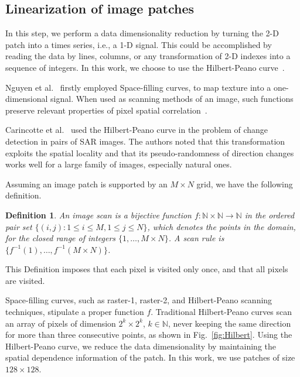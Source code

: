 \documentclass[journal]{IEEEtran}
\begin{document}
	\subsection{Linearization of image patches}\label{linearization}
	
	In this step, we perform a data dimensionality reduction by turning the 2-D patch into a times series, i.e., a 1-D signal.
	This could be accomplished by reading the data by lines, columns, or any transformation of 2-D indexes into a sequence of integers.
	In this work, we choose to use the Hilbert-Peano curve~\cite{Lee1994Texture}.
	
	Nguyen et al.~\cite{nguyen1982space} firstly employed Space-filling curves, to map texture into a one-dimensional signal.
	When used as scanning methods of an image, such functions preserve relevant properties of pixel spatial correlation~\cite{Lee1994Texture}.
	
	Carincotte et al.~\cite{Carincotte2006changeDetection} used the Hilbert-Peano curve in the problem of change detection in pairs of SAR images.
	The authors noted that this transformation exploits the spatial locality and that its pseudo-randomness
	of direction changes works well for a large family of images, especially
	natural ones.
	
	Assuming an image patch is supported by an $M \times N$ grid, we have the following definition.
	
	\newtheorem{mydef}{Definition}
	\begin{mydef}
		An image scan is a bijective function $f \colon \mathbb{N} \times \mathbb{N} \to \mathbb{N}$ in the ordered pair set $ \{(i, j): 1 \leq i \leq M , 1 \leq j \leq N\}$, which denotes the points in the domain, for the closed range of integers $\{1, \dots, M \times N\}$.
		A scan rule is $\{f^{-1}(1), \dots, f^{-1}(M \times N)\}$.
		\label{def:CurveFilling}
	\end{mydef}
	This Definition imposes that each pixel is visited only once, and that all pixels are visited.
	
	Space-filling curves, such as raster-1, raster-2, and Hilbert-Peano scanning techniques, stipulate a proper function $f$.
	Traditional Hilbert-Peano curves scan an array of pixels of dimension $2^k \times 2^k$, $k \in \mathbb{N}$, never keeping the same direction for more than three consecutive points, as shown in Fig.~\ref{fig:Hilbert}.
	Using the Hilbert-Peano curve, we reduce the data dimensionality by maintaining the spatial dependence information of the patch.
	In this work, we use patches of size $128 \times 128$.
	
\end{document}
